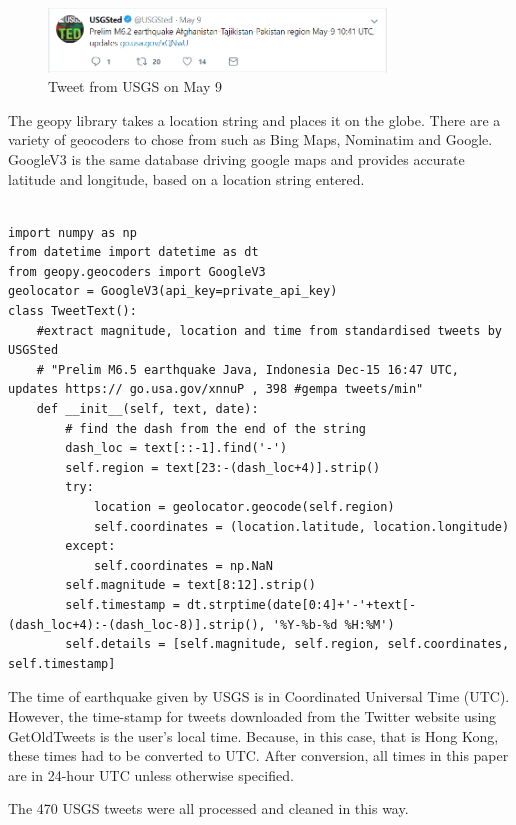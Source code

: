 \begin{figure}[H]
\caption{Tweet from USGS on May 9}  \label{fig:USGSTed} 
\centering
\includegraphics[width=0.8\textwidth]{Figures/USGSTed_May9.PNG}
\end{figure}

The geopy library takes a location string and places it on the globe\cite{geopy}. There are a variety of geocoders to chose from such as Bing Maps, Nominatim and Google. GoogleV3 is the same database driving google maps and provides accurate latitude and longitude, based on a location string entered.

\begin{lstlisting}[caption={Extracting data from standardised USGS tweets}, captionpos=t, label={lst:extracting}]

import numpy as np
from datetime import datetime as dt
from geopy.geocoders import GoogleV3
geolocator = GoogleV3(api_key=private_api_key)
class TweetText():
    #extract magnitude, location and time from standardised tweets by USGSted
    # "Prelim M6.5 earthquake Java, Indonesia Dec-15 16:47 UTC, updates https:// go.usa.gov/xnnuP , 398 #gempa tweets/min"
    def __init__(self, text, date):
        # find the dash from the end of the string
        dash_loc = text[::-1].find('-')
        self.region = text[23:-(dash_loc+4)].strip()
        try:
            location = geolocator.geocode(self.region)
            self.coordinates = (location.latitude, location.longitude)
        except:
            self.coordinates = np.NaN
        self.magnitude = text[8:12].strip()
        self.timestamp = dt.strptime(date[0:4]+'-'+text[-(dash_loc+4):-(dash_loc-8)].strip(), '%Y-%b-%d %H:%M')
        self.details = [self.magnitude, self.region, self.coordinates, self.timestamp]
\end{lstlisting}

The time of earthquake given by USGS is in Coordinated Universal Time (UTC). However, the time-stamp for tweets downloaded from the Twitter website using GetOldTweets is the user's local time. Because, in this case, that is Hong Kong, these times had to be converted to UTC. After conversion, all times in this paper are in 24-hour UTC unless otherwise specified.

The 470 USGS tweets were all processed and cleaned in this way.

